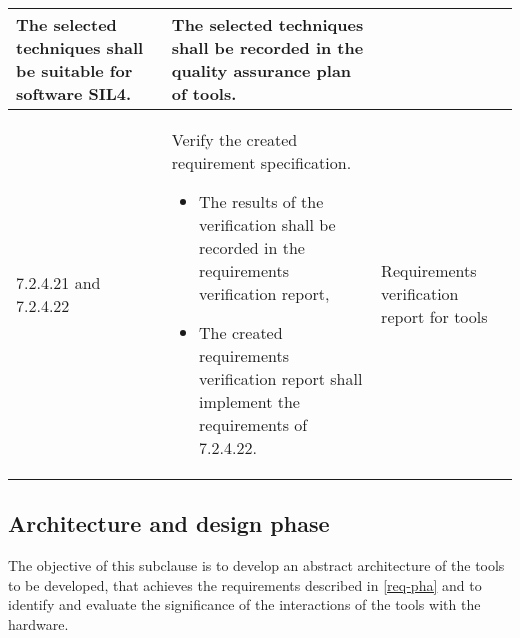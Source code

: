 \documentclass{template/openetcs_report}
\begin{document}
{\begin{longtable}{|p{2cm}|p{9cm}|p{3cm}|}
The selected techniques shall be suitable for software SIL4.
& The selected techniques shall be recorded in the quality assurance plan of tools.\\ 
\hline
7.2.4.21 and 7.2.4.22 & Verify the created requirement specification. 
\begin{itemize}\itemsep=0pt
  \item The results of the verification shall be recorded in the requirements verification report,
  \item The created requirements verification report shall implement the requirements of 7.2.4.22. 
\end{itemize}
& Requirements verification report for tools\\ 
\hline
\end{longtable}}


\subsection{Architecture and design phase}
\label{arc-pha}
\begin{flushleft}
The objective of this subclause is to develop an abstract architecture of the tools to be developed, that achieves the requirements described in \ref{req-pha} and to identify and evaluate the significance of the interactions of the tools with the hardware.
 \end{flushleft} 
\end{document}
